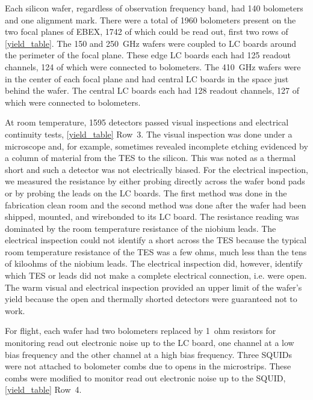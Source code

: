 Each silicon wafer, regardless of observation frequency band, had 140 bolometers and one alignment mark. %
There were a total of 1960 bolometers present on the two focal planes of \ac{EBEX}, 1742 of which could be read out, first two rows of \TAB\ref{yield_table}. 
The 150 and 250~GHz wafers were coupled to \ac{LC} boards around the perimeter of the focal plane. These edge \ac{LC} boards each had 125 readout channels, 124 of which were connected to bolometers.  
The 410~GHz wafers were in the center of each focal plane and had central \ac{LC} boards in the space just behind the wafer. The central \ac{LC} boards each had 128 readout channels, 127 of which were connected to bolometers. %

At room temperature, 1595 detectors passed visual inspections and electrical continuity tests, \TAB\ref{yield_table} Row~3. 
The visual inspection was done under a microscope and, for example, sometimes revealed incomplete etching evidenced by a column of material from the \ac{TES} to the silicon. 
This was noted as a thermal short and such a detector was not electrically biased. 
For the electrical inspection, we measured the resistance by either probing directly across the wafer bond pads or by probing the leads on the \ac{LC} boards. 
The first method was done in the fabrication clean room and the second method was done after the wafer had been shipped, mounted, and wirebonded to its \ac{LC} board. 
The resistance reading was dominated by the room temperature resistance of the niobium leads. 
The electrical inspection could not identify a short across the \ac{TES} because the typical room temperature resistance of the \ac{TES} was a few ohms, much less than the tens of kiloohms of the niobium leads. 
The electrical inspection did, however, identify which \ac{TES} or leads did not make a complete electrical connection, i.e. were open. 
The warm visual and electrical inspection provided an upper limit of the wafer's yield because the open and thermally shorted detectors were guaranteed not to work. 

For flight, each wafer had two bolometers replaced by 1~ohm resistors for monitoring read out electronic noise up to the \ac{LC} board, one channel at a low bias frequency and the other channel at a high bias frequency. 
Three \ac{SQUID}s were not attached to bolometer combs due to opens in the microstrips. These combs were modified to monitor read out electronic noise up to the \ac{SQUID}, \TAB\ref{yield_table} Row~4. 

